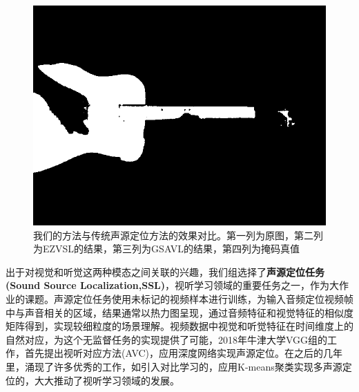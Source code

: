 \documentclass[12pt]{article}
\begin{document}
\begin{figure}[!h]
{\begin{minipage}[t]{0.25\linewidth}
  \includegraphics[width=1\linewidth]{29_avobj.png}
  \end{minipage}%
  }%
  \centering
  \caption{我们的方法与传统声源定位方法的效果对比。第一列为原图，第二列为EZVSL的结果，第三列为GSAVL的结果，第四列为掩码真值}
  \label{ref:res}
\end{figure}

出于对视觉和听觉这两种模态之间关联的兴趣，我们组选择了\textbf{声源定位任务(Sound Source Localization,SSL)}，视听学习领域的重要任务之一，作为大作业的课题。声源定位任务使用未标记的视频样本进行训练，为输入音频定位视频帧中与声音相关的区域，结果通常以热力图呈现，通过音频特征和视觉特征的相似度矩阵得到，实现较细粒度的场景理解。视频数据中视觉和听觉特征在时间维度上的自然对应，为这个无监督任务的实现提供了可能，2018年牛津大学VGG组的工作\cite{object}，首先提出视听对应方法(AVC)，应用深度网络实现声源定位。在之后的几年里，涌现了许多优秀的工作，如引入对比学习的\cite{10}，应用K-means聚类实现多声源定位的\cite{9}，大大推动了视听学习领域的发展。
\end{document}
